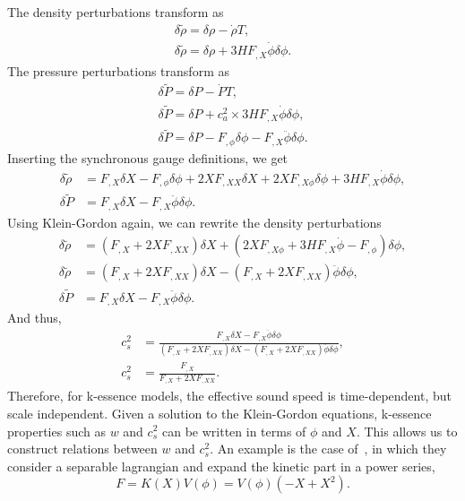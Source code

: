 \documentclass{article}
\begin{document}
The density perturbations transform as
\begin{align*}
    \delta\tilde\rho = \delta\rho - \dot\rho T, \\
    \delta\tilde\rho = \delta\rho + 3HF_{,X}\dot\phi\delta\phi.
\end{align*}
The pressure perturbations transform as
\begin{align*}
    \delta\tilde P = \delta P - \dot P T, \\
    \delta\tilde P = \delta P + c_a^2 \times 3HF_{,X}\dot\phi\delta\phi, \\
    \delta\tilde P = \delta P - F_{,\phi}\delta \phi - F_{,X}\ddot\phi\delta\phi.
\end{align*}
Inserting the synchronous gauge definitions, we get
\begin{align*}
    \delta\tilde\rho &= F_{,X}\delta X - F_{,\phi}\delta\phi + 2XF_{,XX}\delta X + 2XF_{,X\phi}\delta\phi + 3HF_{,X}\dot\phi\delta\phi, \\
    \delta\tilde P &= F_{,X}\delta X - F_{,X}\ddot\phi\delta\phi.
\end{align*}
Using Klein-Gordon again, we can rewrite the density perturbations
\begin{align*}
    \delta\tilde\rho &= (F_{,X} + 2XF_{,XX})\delta X + (2XF_{,X\phi} + 3HF_{,X}\dot\phi - F_{,\phi})\delta\phi, \\
    \delta\tilde\rho &= (F_{,X} + 2XF_{,XX})\delta X - (F_{,X} + 2XF_{,XX})\ddot\phi\delta\phi, \\
    \delta\tilde P &= F_{,X}\delta X - F_{,X}\ddot\phi\delta\phi.
\end{align*}
And thus,
\begin{align}
    c_s^2 &= \frac{F_{,X}\delta X - F_{,X}\ddot\phi\delta\phi}{(F_{,X} + 2XF_{,XX})\delta X - (F_{,X} + 2XF_{,XX})\ddot\phi\delta\phi}, \\
    c_s^2 &= \frac{F_{,X}}{F_{,X} + 2XF_{,XX}}.
\end{align}
Therefore, for k-essence models, the effective sound speed is time-dependent, but scale independent. Given a solution to the Klein-Gordon equations, k-essence properties such as $w$ and $c_s^2$ can be written in terms of $\phi$ and $X$. This allows us to construct relations between $w$ and $c_s^2$. An example is the case of~\cite{kessence}, in which they consider a separable lagrangian and expand the kinetic part in a power series,
\begin{equation}
    F = K(X)V(\phi) = V(\phi)(-X + X^2).
\end{equation}
\end{document}
